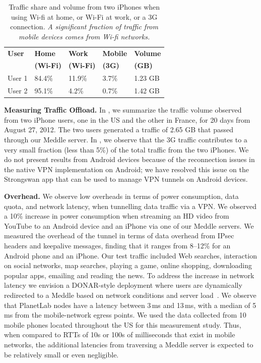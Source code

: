 \documentclass{sig-alternate-10pt}
\newcommand{\meddle}{{Meddle}\xspace}
\renewcommand{\fref}{\Fref}
\begin{document}
\begin{table}
\centering
\begin{small}
\begin{tabular}{|l|l|l|l|l|}
\hline
{\bf User} & {\bf Home} & {\bf Work} & {\bf Mobile} & {\bf Volume}\\
    & {\bf (Wi-Fi)} & {\bf (Wi-Fi)} & {\bf (3G)} & {\bf (GB)}\\
\hline
User 1 & 84.4\% & 11.9\% & 3.7\%  & 1.23 GB\\
\hline
User 2 & 95.1\% & 4.2\% & 0.7\%  & 1.42 GB\\
\hline
\end{tabular}
\end{small}
\caption{Traffic share and volume from two iPhones when using Wi-fi at
  home, or Wi-Fi at work, or a 3G connection. \emph{A significant
    fraction of traffic from mobile devices comes from Wi-fi networks.}}
\label{tab:Usage}
\vspace{-0.1in}
\end{table}

\textbf{Measuring Traffic Offload.} In \fref{tab:Usage}, we summarize
the traffic volume observed from two iPhone users, one in the US and
the other in France, for 20 days from August 27, 2012. The two users
generated a traffic of 2.65 GB that passed through our \meddle
server. In \fref{tab:Usage}, we observe that the 3G traffic contributes
to a very small fraction (less than 5\%) of the total traffic from the
two iPhones. We do not present results from Android devices because
of the reconnection issues in the native VPN implementation on
Android; we have resolved this issue on the Strongswan app that can be
used to manage VPN tunnels on Android devices. 

\textbf{Overhead.} We observe low overheads in terms of power
consumption, data quota, and network latency, when tunnelling data
traffic via a VPN. We observed a 10\%  increase in power consumption
when streaming an HD video from YouTube to an Android device and an
iPhone via one of our \meddle servers. We measured the overhead of the
tunnel in terms of data overhead from IPsec headers and keepalive
messages, finding that it ranges from 8--12\% for an Android phone and
an iPhone. Our test traffic included Web searches, interaction on
social networks, map searches, playing a game, online shopping,
downloading popular apps, emailing and reading the news. To address
the increase in network latency we envision a DONAR-style deployment
where users are dynamically redirected to a \meddle based on network
conditions and server load~\cite{wendell:donar}. We observe that
PlanetLab nodes have a latency between 3\,ms and 13\,ms, with a median
of 5\,ms from the mobile-network egress points. We used the data
collected from 10 mobile phones located throughout the US for this
measurement study. Thus, when compared to RTTs of 10s or 100s of
milliseconds that exist in mobile networks, the additional latencies
from traversing a \meddle server is expected to be relatively small or
even negligible.  
\end{document}
